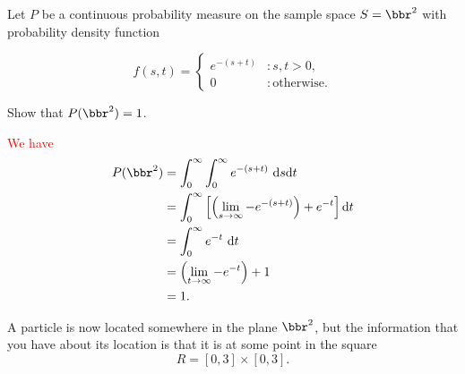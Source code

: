 \documentclass[12pt,reqno]{amsart}
\begin{document}
\bigskip
\prob Let $P$ be a continuous probability measure on the sample space $S=\bbr^2$ with probability density function

\[f(s,t) = \begin{cases}
e^{-(s+t)} & : s,t >0, \\
0 & : \text{otherwise}.    
\end{cases}\]

Show that $P(\bbr^2)=1$.


\bigskip
\textcolor{red}{We have
    \begin{align*}
    P(\bbr^2) &= \int_0^\infty \int_0^\infty e^{-(s+t)} \ \text{d}s \text{d}t \\
    &= \int_0^\infty \left[\left(\lim_{s\to\infty}-e^{-(s+t)}\right)+ e^{-t} \right]    \text{d}t \\
    &= \int_0^\infty e^{-t} \ \text{d} t \\
    &= \left( \lim_{t\to \infty} -e^{-t}  \right) +1 \\
    &= 1.
    \end{align*}}
\bigskip















\bigskip
\prob A particle is now located somewhere in the plane $\bbr^2$, but the  information that you have about its location is that it is at some point in the square
    \[R = [0,3] \times [0,3].\]
\end{document}
